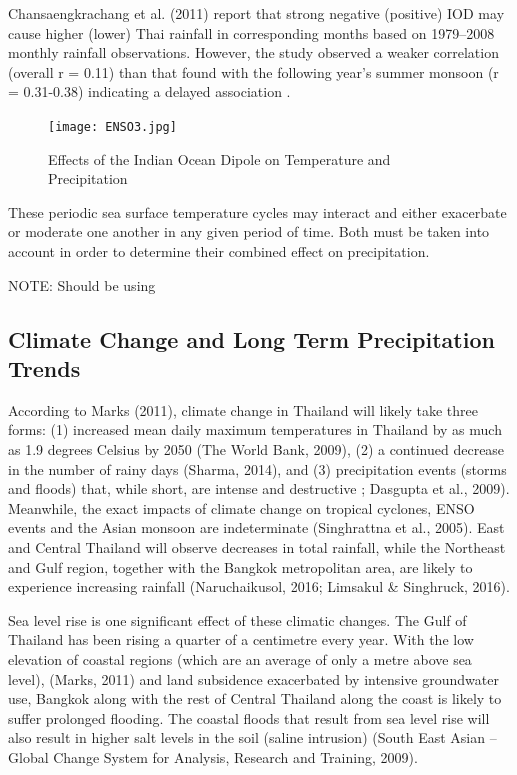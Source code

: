 Chansaengkrachang et al. (2011) report that strong negative (positive) 
IOD may cause higher (lower) Thai rainfall in corresponding months based 
on 1979–2008 monthly rainfall observations. However, the study observed 
a weaker correlation 
(overall r 
=
0.11) 
than that found 
with the following 
year's 
summer monsoon (r = 0.31-0.38) indicating a delayed association \citep{bridhikitti2013connections}.

\begin{figure}[h!]
	\centering
		\texttt{[image: ENSO3.jpg]}
	\caption{Effects of the Indian Ocean Dipole on Temperature and Precipitation}
	\label{fig:ENSO3}
\end{figure}


These periodic sea surface temperature cycles may interact and either exacerbate or moderate one another in any given period of time. Both must be taken into account in order to determine their combined effect on precipitation.

NOTE: Should be using \citet{ashok2003influence, hu2015pacific}

\subsection{Climate Change and Long Term Precipitation Trends}

According to Marks (2011), climate change in Thailand will likely take three forms: (1) increased mean daily maximum temperatures in Thailand by as much as 1.9 degrees Celsius by 2050 (The World Bank, 2009), (2) a continued decrease in the number of rainy days (Sharma, 2014), and (3) precipitation events (storms and floods) that, while short, are intense and destructive \citep{anthes2006hurricanes}; Dasgupta et al., 2009). Meanwhile, the exact impacts of climate change on tropical cyclones, ENSO events and the Asian monsoon are indeterminate (Singhrattna et al., 2005). East and Central Thailand will observe decreases in total rainfall, while the Northeast and Gulf region, together with the Bangkok metropolitan area, are likely to experience increasing rainfall (Naruchaikusol, 2016; Limsakul \& Singhruck, 2016).

Sea level rise is one significant effect of these climatic changes. The Gulf of Thailand has been rising a quarter of a centimetre every year. With the low elevation of coastal regions (which are an average of only a metre above sea level), (Marks, 2011) and land subsidence exacerbated by intensive groundwater use, Bangkok along with the rest of Central Thailand along the coast is likely to suffer prolonged flooding. The coastal floods that result from sea level rise will also result in higher salt levels in the soil (saline intrusion) (South East Asian -- Global Change System for Analysis, Research and Training, 2009).

